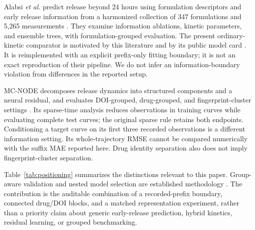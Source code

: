 \documentclass[conference,letterpaper]{IEEEtran}
\begin{document}
Alabsi \emph{et al.} predict release beyond 24 hours using formulation descriptors and early release information from a harmonized collection of 347 formulations and 5,265 measurements \cite{alabsi2026}. They examine information ablations, kinetic parameters, and ensemble trees, with formulation-grouped evaluation. The present ordinary-kinetic comparator is motivated by this literature and by its public model card \cite{alabsiModelCard}. It is reimplemented with an explicit prefix-only fitting boundary; it is not an exact reproduction of their pipeline. We do not infer an information-boundary violation from differences in the reported setup.

MC-NODE decomposes release dynamics into structured components and a neural residual, and evaluates DOI-grouped, drug-grouped, and fingerprint-cluster settings \cite{tang2026}. Its sparse-time analysis reduces observations in training curves while evaluating complete test curves; the original sparse rule retains both endpoints. Conditioning a target curve on its first three recorded observations is a different information setting. Its whole-trajectory RMSE cannot be compared numerically with the suffix MAE reported here. Drug identity separation also does not imply fingerprint-cluster separation.

Table~\ref{tab:positioning} summarizes the distinctions relevant to this paper. Group-aware validation and nested model selection are established methodology \cite{roberts2017,varma2006}. The contribution is the auditable combination of a recorded-prefix boundary, connected drug/DOI blocks, and a matched representation experiment, rather than a priority claim about generic early-release prediction, hybrid kinetics, residual learning, or grouped benchmarking.
\end{document}
